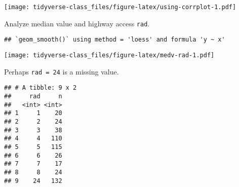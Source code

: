 \documentclass[]{book}
\newenvironment{Shaded}{\begin{snugshade}}{\end{snugshade}}
\newcommand{\KeywordTok}[1]{\textcolor[rgb]{0.13,0.29,0.53}{\textbf{#1}}}
\newcommand{\DataTypeTok}[1]{\textcolor[rgb]{0.13,0.29,0.53}{#1}}
\newcommand{\DecValTok}[1]{\textcolor[rgb]{0.00,0.00,0.81}{#1}}
\newcommand{\FloatTok}[1]{\textcolor[rgb]{0.00,0.00,0.81}{#1}}
\newcommand{\StringTok}[1]{\textcolor[rgb]{0.31,0.60,0.02}{#1}}
\newcommand{\CommentTok}[1]{\textcolor[rgb]{0.56,0.35,0.01}{\textit{#1}}}
\newcommand{\OtherTok}[1]{\textcolor[rgb]{0.56,0.35,0.01}{#1}}
\newcommand{\OperatorTok}[1]{\textcolor[rgb]{0.81,0.36,0.00}{\textbf{#1}}}
\newcommand{\NormalTok}[1]{#1}
\begin{document}
\texttt{[image: tidyverse-class\_files/figure-latex/using-corrplot-1.pdf]}

Analyze median value and highway access \texttt{rad}.

\begin{Shaded}
\end{Shaded}

\begin{verbatim}
## `geom_smooth()` using method = 'loess' and formula 'y ~ x'
\end{verbatim}

\texttt{[image: tidyverse-class\_files/figure-latex/medv-rad-1.pdf]}

Perhaps \texttt{rad\ =\ 24} is a missing value.

\begin{Shaded}
\end{Shaded}

\begin{verbatim}
## # A tibble: 9 x 2
##     rad     n
##   <int> <int>
## 1     1    20
## 2     2    24
## 3     3    38
## 4     4   110
## 5     5   115
## 6     6    26
## 7     7    17
## 8     8    24
## 9    24   132
\end{verbatim}

\begin{Shaded}
\end{Shaded}
\end{document}
